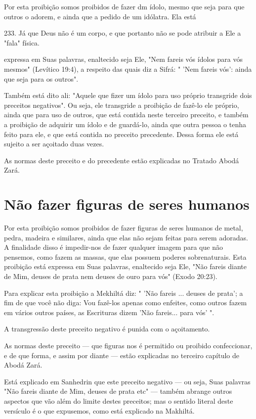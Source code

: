 \begin{itemize}
\begin{enumrate}
\begin{itemize}
\begin{itemize}
\begin{itemize}
Por esta proibição somos proibidos de fazer dm ídolo, mesmo que seja
para que outros o adorem, e ainda que a pedido de um idólatra. Ela está

233. Já que Deus não é um corpo, e que portanto não se pode atribuir a
Ele a "fala" física.

expressa em Suas palavras, enaltecido seja Ele, "Nem fareis vós ídolos
para vós mesmos" (Levítico 19:4), a respeito das quais diz a Sifrá: "
'Nem fareis vós': ainda que seja para os outros".

Também está dito ali: "Aquele que fizer um ídolo para uso próprio
transgride dois preceitos negativos". Ou seja, ele transgride a
proibição de fazê-lo ele próprio, ainda que para uso de outros, que está
contida neste terceiro pre­ceito, e também a proibição de adquirir um
ídolo e de guardá-lo, ainda que ou­tra pessoa o tenha feito para ele, e
que está contida no preceito precedente. Dessa forma ele está sujeito a
ser açoitado duas vezes.

As normas deste preceito e do precedente estão explicadas no Tra­tado
Abodá Zará.

\section{Não fazer figuras de seres humanos}

Por esta proibição somos proibidos de fazer figuras de seres huma­nos de
metal, pedra, madeira e similares, ainda que elas não sejam feitas para
serem adoradas. A finalidade disso é impedir-nos de fazer qualquer
imagem pa­ra que não pensemos, como fazem as massas, que elas possuem
poderes sobre­naturais. Esta proibição está expressa em Suas palavras,
enaltecido seja Ele, "Não fareis diante de Mim, deuses de prata nem
deuses de ouro para vós" (Exodo 20:23).

Para explicar esta proibição a Mekhiltá diz: " 'Não fareis ... deuses de
prata'; a fim de que você não diga: Vou fazê-los apenas como enfeites,
como outros fazem em vários outros países, as Escrituras dizem 'Não
fareis... para vós' ".

A transgressão deste preceito negativo é punida com o açoitamento.

As normas deste preceito --- que figuras nos é permitido ou proibi­do
confeccionar, e de que forma, e assim por diante --- estão explicadas no
ter­ceiro capítulo de Abodá Zará.

Está explicado em Sanhedrin que este preceito negativo --- ou seja, Suas
palavras "Não fareis diante de Mim, deuses de prata etc" --- também
abrange outros aspectos que vão além do limite destes preceitos; mas o
sentido literal deste versículo é o que expusemos, como está explicado
na Makhiltá.


\end{itemize}
\end{itemize}
\end{itemize}
\end{enumrate}
\end{itemize}
